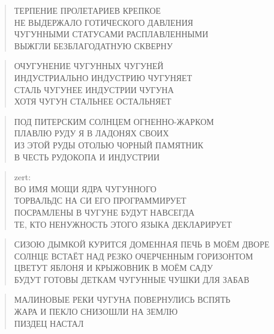 \poemtitle{***}
\begin{verse}
ТЕРПЕНИЕ ПРОЛЕТАРИЕВ КРЕПКОЕ\\
НЕ ВЫДЕРЖАЛО ГОТИЧЕСКОГО ДАВЛЕНИЯ\\
ЧУГУННЫМИ СТАТУСАМИ РАСПЛАВЛЕННЫМИ\\
ВЫЖГЛИ БЕЗБЛАГОДАТНУЮ СКВЕРНУ
\end{verse}

\poemtitle{***}
\begin{verse}
ОЧУГУНЕНИЕ ЧУГУННЫХ ЧУГУНЕЙ\\
ИНДУСТРИАЛЬНО ИНДУСТРИЮ ЧУГУНЯЕТ\\
СТАЛЬ ЧУГУНЕЕ ИНДУСТРИИ ЧУГУНА\\
ХОТЯ ЧУГУН СТАЛЬНЕЕ ОСТАЛЬНЯЕТ
\end{verse}

\poemtitle{***}
\begin{verse}
ПОД ПИТЕРСКИМ СОЛНЦЕМ ОГНЕННО-ЖАРКОМ\\
ПЛАВЛЮ РУДУ Я В ЛАДОНЯХ СВОИХ\\
ИЗ ЭТОЙ РУДЫ ОТОЛЬЮ ЧОРНЫЙ ПАМЯТНИК\\
В ЧЕСТЬ РУДОКОПА И ИНДУСТРИИ
\end{verse}

\poemtitle{***}
\begin{verse}
zert: \\
ВО ИМЯ МОЩИ ЯДРА ЧУГУННОГО\\
ТОРВАЛЬДС НА СИ ЕГО ПРОГРАММИРУЕТ\\
ПОСРАМЛЕНЫ В ЧУГУНЕ БУДУТ НАВСЕГДА\\
ТЕ, КТО НЕНУЖНОСТЬ ЭТОГО ЯЗЫКА ДЕКЛАРИРУЕТ
\end{verse}

\poemtitle{***}
\begin{verse}
СИЗОЮ ДЫМКОЙ КУРИТСЯ ДОМЕННАЯ ПЕЧЬ В МОЁМ ДВОРЕ\\
СОЛНЦЕ ВСТАЁТ НАД РЕЗКО ОЧЕРЧЕННЫМ ГОРИЗОНТОМ\\
ЦВЕТУТ ЯБЛОНЯ И КРЫЖОВНИК В МОЁМ САДУ\\
БУДУТ ГОТОВЫ ДЕТКАМ ЧУГУННЫЕ ЧУШКИ ДЛЯ ЗАБАВ
\end{verse}

\poemtitle{***}
\begin{verse}
МАЛИНОВЫЕ РЕКИ ЧУГУНА ПОВЕРНУЛИСЬ ВСПЯТЬ\\
ЖАРА И ПЕКЛО СНИЗОШЛИ НА ЗЕМЛЮ\\
ПИЗДЕЦ НАСТАЛ
\end{verse}

